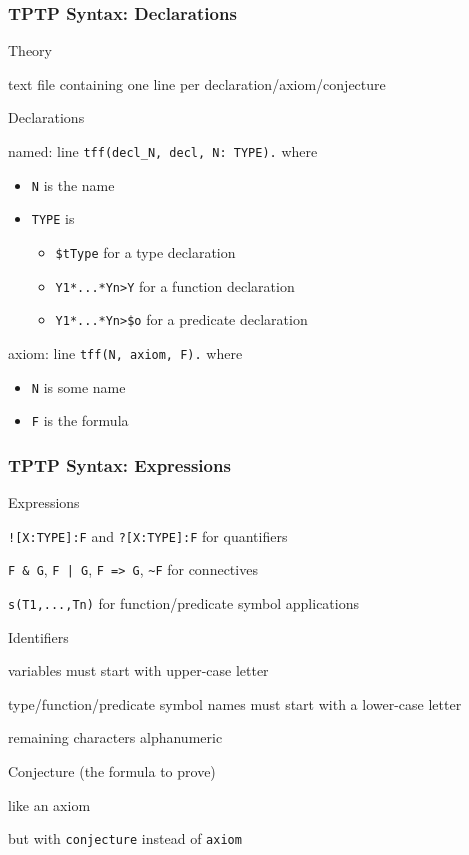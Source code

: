 \begin{frame}[fragile]\frametitle{TPTP Syntax: Declarations}
\begin{blockitems}{Theory}
\item text file containing one line per declaration/axiom/conjecture
\end{blockitems}

\begin{blockitems}{Declarations}
\item named: line \lstinline|tff(decl_N, decl, N: TYPE).| where
\begin{itemize}
\item \lstinline|N| is the name
\item \lstinline|TYPE| is
 \begin{itemize}
 \item \lstinline[mathescape=false]|$tType| for a type declaration
 \item \lstinline|Y1*...*Yn>Y| for a function declaration
 \item \lstinline[mathescape=false]|Y1*...*Yn>$o| for a predicate declaration
 \end{itemize}
\end{itemize}
\item axiom: line \lstinline|tff(N, axiom, F).| where
\begin{itemize}
\item \lstinline|N| is some name
\item \lstinline|F| is the formula
\end{itemize}
\end{blockitems}
\end{frame}

\begin{frame}[fragile]\frametitle{TPTP Syntax: Expressions}
\begin{blockitems}{Expressions}
\item \lstinline|![X:TYPE]:F| and \lstinline|?[X:TYPE]:F| for quantifiers
\item \lstinline!F & G!, \lstinline!F | G!, \lstinline!F => G!, \lstinline!~F! for connectives
\item \lstinline|s(T1,...,Tn)| for function/predicate symbol applications
\end{blockitems}

\begin{blockitems}{Identifiers}
\item variables must start with upper-case letter
\item type/function/predicate symbol names must start with a lower-case letter
\item remaining characters alphanumeric
\end{blockitems}

\begin{blockitems}{Conjecture (the formula to prove)}
\item like an axiom
\item but with \lstinline|conjecture| instead of \lstinline|axiom|
\end{blockitems}
\end{frame}


